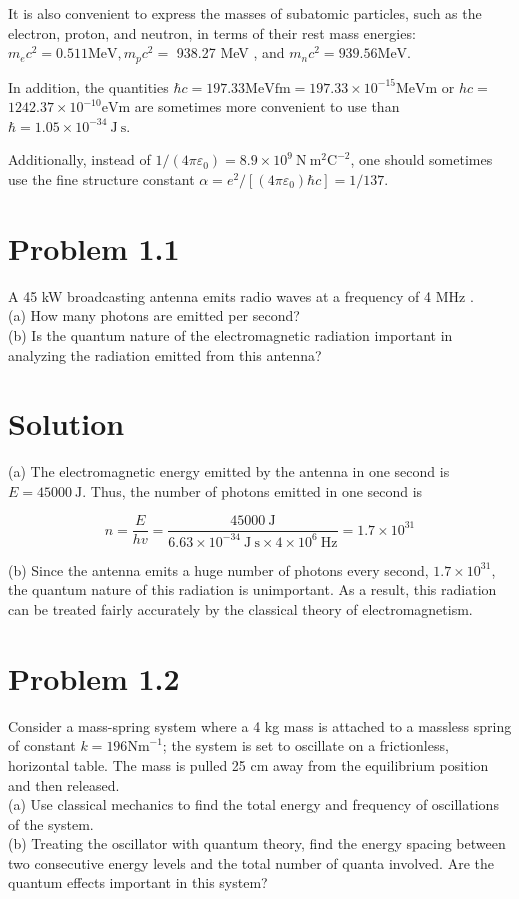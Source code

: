\documentclass[10pt]{article}
\begin{document}
It is also convenient to express the masses of subatomic particles, such as the electron, proton, and neutron, in terms of their rest mass energies: $m_{e} c^{2}=0.511 \mathrm{MeV}, m_{p} c^{2}=$ 938.27 MeV , and $m_{n} c^{2}=939.56 \mathrm{MeV}$.

In addition, the quantities $\hbar c=197.33 \mathrm{MeV} \mathrm{fm}=197.33 \times 10^{-15} \mathrm{MeV} \mathrm{m}$ or $h c=$ $1242.37 \times 10^{-10} \mathrm{eV} \mathrm{m}$ are sometimes more convenient to use than $\hbar=1.05 \times 10^{-34} \mathrm{~J} \mathrm{~s}$.

Additionally, instead of $1 /\left(4 \pi \varepsilon_{0}\right)=8.9 \times 10^{9} \mathrm{~N} \mathrm{~m}^{2} \mathrm{C}^{-2}$, one should sometimes use the fine structure constant $\alpha=e^{2} /\left[\left(4 \pi \varepsilon_{0}\right) \hbar c\right]=1 / 137$.

\section*{Problem 1.1}
A 45 kW broadcasting antenna emits radio waves at a frequency of 4 MHz .\\
(a) How many photons are emitted per second?\\
(b) Is the quantum nature of the electromagnetic radiation important in analyzing the radiation emitted from this antenna?

\section*{Solution}
(a) The electromagnetic energy emitted by the antenna in one second is $E=45000 \mathrm{~J}$. Thus, the number of photons emitted in one second is


\begin{equation*}
n=\frac{E}{h v}=\frac{45000 \mathrm{~J}}{6.63 \times 10^{-34} \mathrm{~J} \mathrm{~s} \times 4 \times 10^{6} \mathrm{~Hz}}=1.7 \times 10^{31} \tag{1.158}
\end{equation*}


(b) Since the antenna emits a huge number of photons every second, $1.7 \times 10^{31}$, the quantum nature of this radiation is unimportant. As a result, this radiation can be treated fairly accurately by the classical theory of electromagnetism.

\section*{Problem 1.2}
Consider a mass-spring system where a 4 kg mass is attached to a massless spring of constant $k=196 \mathrm{Nm}^{-1}$; the system is set to oscillate on a frictionless, horizontal table. The mass is pulled 25 cm away from the equilibrium position and then released.\\
(a) Use classical mechanics to find the total energy and frequency of oscillations of the system.\\
(b) Treating the oscillator with quantum theory, find the energy spacing between two consecutive energy levels and the total number of quanta involved. Are the quantum effects important in this system?
\end{document}
